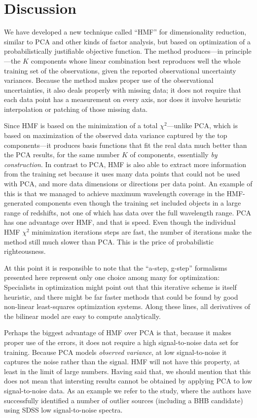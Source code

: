 \documentclass[12pt,preprint]{aastex}
\begin{document}
\section{Discussion}\label{sec:discussion}
We have developed a new technique called ``HMF'' for dimensionality
reduction, similar to PCA and other kinds of factor analysis, but
based on optimization of a probabilistically justifiable objective
function.  The method produces---in principle---the $K$ components
whose linear combination best reproduces well the whole training set
of the observations, given the reported observational uncertainty
variances.  Because the method makes proper use of the observational
uncertainties, it also deals properly with missing data; it does not
require that each data point has a measurement on every axis, nor does
it involve heuristic interpolation or patching of those missing data.

Since HMF is based on the minimization of a total $\chi^2$---unlike
PCA, which is based on maximization of the observed data variance
captured by the top components---it produces basis functions that fit
the real data much better than the PCA results, for the same number
$K$ of components, essentially \emph{by construction}.  In contrast to PCA,
HMF is also able to extract more information from the training set
because it uses many data points that could not be used with PCA, and
more data dimensions or directions per data point. An example of this
is that we managed to achieve maximum wavelength coverage in the
HMF-generated components even though the training set included objects
in a large range of redshifts, not one of which has data over the full
wavelength range.  PCA has one advantage over HMF, and that is
speed. Even though the individual HMF $\chi^2$ minimization iterations
steps are fast, the number of iterations make the method still much
slower than PCA. This is the price of probabilistic righteousness.

At this point it is responsible to note that the ``a-step, g-step''
formalisms presented here represent only one choice among many for
optimization: Specialists in optimization might point out that this
iterative scheme is itself heuristic, and there might be far faster
methods that could be found by good non-linear least-squares
optimization systems.  Along these lines, all derivatives of the
bilinear model are easy to compute analytically.

Perhaps the biggest advantage of HMF over PCA is that, because it
makes proper use of the errors, it does not require a high
signal-to-noise data set for training.  Because PCA models
\emph{observed variance}, at low signal-to-noise it captures the noise
rather than the signal.  HMF will not have this property, at least in
the limit of large numbers. Having said that, we should mention 
that this does not mean that intersting results cannot be obtained by 
applying PCA to low signal-to-noise data. As an example we refer to the 
\citet{borosona} study, where the authors have successfully identified a 
number of outlier sources (including a BHB candidate) using SDSS low 
signal-to-noise spectra.
\end{document}
